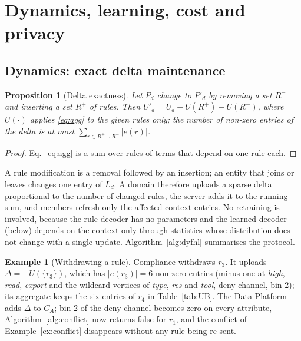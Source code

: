 \documentclass[preprint,12pt]{elsarticle}
\newtheorem{proposition}{Proposition}
\theoremstyle{definition}
\newtheorem{example}{Example}
\begin{document}
\section{Dynamics, learning, cost and privacy}
\label{sec:rest}

\subsection{Dynamics: exact delta maintenance}
\label{sec:delta}
\begin{proposition}[Delta exactness]
\label{prop:delta}
Let $P_d$ change to $P'_d$ by removing a set $R^-$ and inserting a set $R^+$ of rules. Then $U'_d=U_d+U(R^+)-U(R^-)$, where $U(\cdot)$ applies \eqref{eq:agg} to the given rules only; the number of non-zero entries of the delta is at most $\sum_{r\in R^+\cup R^-}|e(r)|$.
\end{proposition}
\begin{proof}
Eq.~\eqref{eq:agg} is a sum over rules of terms that depend on one rule each.
\end{proof}
A rule modification is a removal followed by an insertion; an entity that joins or leaves changes one entry of $L_d$. A domain therefore uploads a sparse delta proportional to the number of changed rules, the server adds it to the running sum, and members refresh only the affected context entries. No retraining is involved, because the rule decoder has no parameters and the learned decoder (below) depends on the context only through statistics whose distribution does not change with a single update. Algorithm~\ref{alg:dyfhl} summarises the protocol.

\begin{example}[Withdrawing a rule]
\label{ex:delta}
Compliance withdraws $r_3$. It uploads $\Delta=-U(\{r_3\})$, which has $|e(r_3)|=6$ non-zero entries (minus one at \emph{high}, \emph{read}, \emph{export} and the wildcard vertices of \textit{type}, \textit{res} and \textit{tool}, deny channel, bin 2); its aggregate keeps the six entries of $r_4$ in Table~\ref{tab:UB}. The Data Platform adds $\Delta$ to $C_A$; bin 2 of the deny channel becomes zero on every attribute, Algorithm~\ref{alg:conflict} now returns false for $r_1$, and the conflict of Example~\ref{ex:conflict} disappears without any rule being re-sent.
\end{example}
\end{document}
